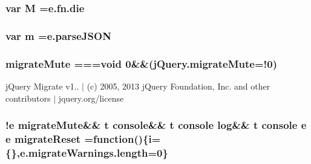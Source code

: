 \subsubsection[{M}]{\setlength{\rightskip}{0pt plus 5cm}var M ={\bf e.\+fn.\+die}}\label{jquery-migrate-1_82_81_8min_8js_af33e4fb80081524297d84c89540aeaca}
\hypertarget{jquery-migrate-1_82_81_8min_8js_a9e77e016b2928d7dcb493b89a0c9dc32}{}
\subsubsection[{m}]{\setlength{\rightskip}{0pt plus 5cm}var m ={\bf e.\+parse\+J\+S\+O\+N}}\label{jquery-migrate-1_82_81_8min_8js_a9e77e016b2928d7dcb493b89a0c9dc32}
\hypertarget{jquery-migrate-1_82_81_8min_8js_ae195c77203e798bee6ede6c8c76c56ae}{}
\subsubsection[{migrate\+Mute}]{ migrate\+Mute ===void 0\&\&(j\+Query.\+migrate\+Mute=!0)}\label{jquery-migrate-1_82_81_8min_8js_ae195c77203e798bee6ede6c8c76c56ae}
j\+Query Migrate v1.. $\vert$ (c) 2005, 2013 j\+Query Foundation, Inc. and other contributors $\vert$ jquery.\+org/license \hypertarget{jquery-migrate-1_82_81_8min_8js_ad5132c36e337c6103a95a3d355e6c4a5}{}
\subsubsection[{migrate\+Reset}]{ !{\bf e} {\bf migrate\+Mute}\&\& {\bf t} console\&\& {\bf t} console {\bf log}\&\& {\bf t} console {\bf e} {\bf e} migrate\+Reset =function()\{{\bf i}=\{\},e.\+migrate\+Warnings.\+length=0\}}\label{jquery-migrate-1_82_81_8min_8js_ad5132c36e337c6103a95a3d355e6c4a5}
\hypertarget{jquery-migrate-1_82_81_8min_8js_a6965eb7cecccff575d9c9b1a65e4623f}{}
